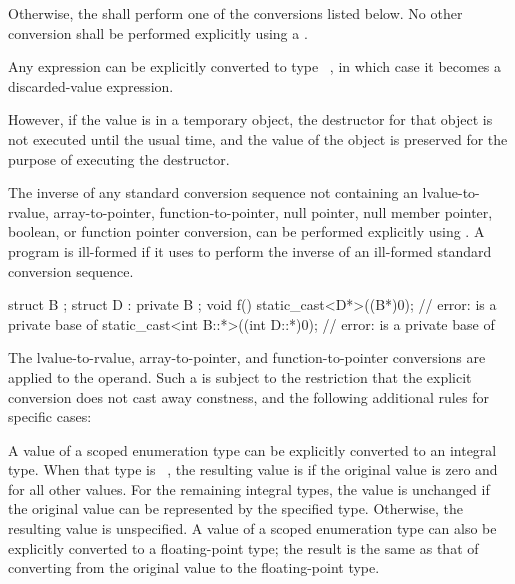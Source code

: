 \pnum
Otherwise, the  shall perform one of the conversions
listed below. No other conversion shall be performed explicitly using a
.

\pnum
Any expression can be explicitly converted to type \cv{}~,
in which case it becomes a discarded-value
expression.
\begin{note}
However, if the value is in a temporary
object, the destructor for that
object is
not executed until the usual time, and the value of the object is
preserved for the purpose of executing the destructor.
\end{note}


\pnum
The inverse of any standard conversion sequence not containing an
lvalue-to-rvalue,
array-to-pointer,
function-to-pointer,
null pointer, null member pointer,
boolean, or
function pointer
conversion, can be performed explicitly using . A
program is ill-formed if it uses  to perform the
inverse of an ill-formed standard conversion sequence.
\begin{example}
\begin{codeblock}
struct B { };
struct D : private B { };
void f() {
  static_cast<D*>((B*)0);               // error:  is a private base of 
  static_cast<int B::*>((int D::*)0);   // error:  is a private base of 
}
\end{codeblock}
\end{example}

\pnum
The lvalue-to-rvalue,
array-to-pointer, and
function-to-pointer conversions are applied to the
operand. Such a  is subject to the restriction that
the explicit conversion does not cast away
constness, and the following additional rules
for specific cases:

\pnum
A value of a scoped enumeration type can be explicitly converted to an
integral type. When that type is \cv{}~, the resulting value is
 if the original value is zero and  for all other
values. For the remaining integral types, the value is unchanged if the
original value can be represented by the
specified type. Otherwise, the resulting value is unspecified.
A value of a scoped enumeration type can also be explicitly converted to a
floating-point type; the result is the same as that of converting from the original
value to the floating-point type.

